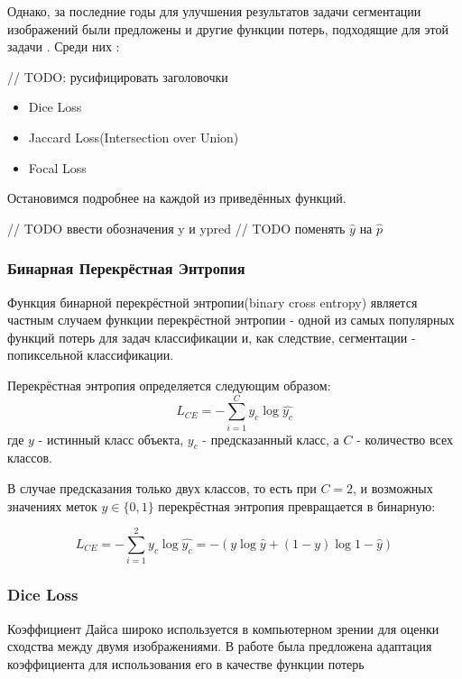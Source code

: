 Однако, за последние годы для улучшения результатов задачи сегментации изображений были предложены и другие функции потерь, подходящие для 
этой задачи \cite{Loss-Functions}. Среди них : 


// TODO: русифицировать заголовочки

\begin{itemize}
    \item Dice Loss \cite{Dice-Loss}
    \item Jaccard Loss(Intersection over Union) \cite{IoU-Loss}
    \item Focal Loss \cite{Focal-Loss}
\end{itemize}

Остановимся подробнее на каждой из приведённых функций.

// TODO ввести обозначения y и ypred
// TODO поменять $\hat{y} $ на $\hat{p}$

\subsubsection{Бинарная Перекрёстная Энтропия}

Функция бинарной перекрёстной энтропии(binary cross entropy) является частным случаем функции перекрёстной энтропии - одной из самых популярных 
функций потерь для задач классификации и, как следствие, сегментации - попиксельной классификации.

Перекрёстная энтропия \cite{CE} определяется следующим образом: 
\begin{equation}
    L_{CE} = -\sum_{i=1}^{C}y_c\log{\hat{y_c}}
\end{equation}
где $y$ - истинный класс объекта, $y_c$ - предсказанный класс, а $C$ - количество 
всех классов.

В случае предсказания только двух классов, то есть при $C=2$, 
и возможных значениях меток $y \in \{0,1\}$
перекрёстная энтропия превращается в бинарную:

\begin{equation}
    L_{CE} = -\sum_{i=1}^{2}y_c\log{\hat{y_c}} = 
    -(y\log{\hat{y}} + (1-y)\log{1-\hat{y}})
\end{equation}

\subsubsection{Dice Loss} 

Коэффициент Дайса широко используется в компьютерном зрении для оценки сходства 
между двумя изображениями. В работе \cite{Dice} была предложена адаптация коэффициента 
для использования его в качестве функции потерь 

